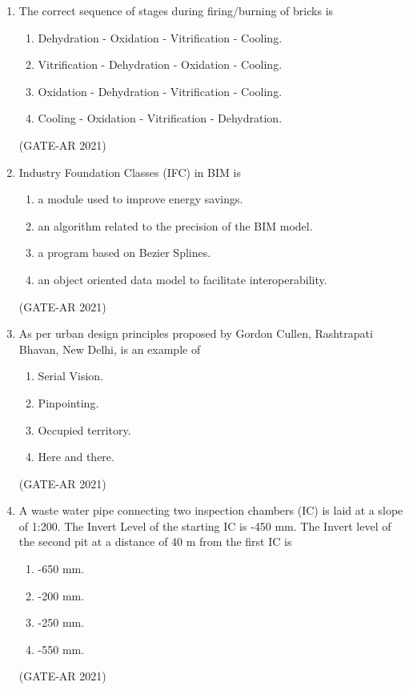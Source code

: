 \documentclass[a4paper,10pt]{article}
\begin{document}
\begin{enumerate}
    \item The correct sequence of stages during firing/burning of bricks is 
    \begin{enumerate}
        \item Dehydration - Oxidation - Vitrification - Cooling.
        \item Vitrification - Dehydration - Oxidation - Cooling.
        \item Oxidation - Dehydration - Vitrification - Cooling.
        \item Cooling - Oxidation - Vitrification - Dehydration.
    \end{enumerate}
    \hfill (GATE-AR 2021)

    \item Industry Foundation Classes (IFC) in BIM is 
    \begin{enumerate}
        \item a module used to improve energy savings.
        \item an algorithm related to the precision of the BIM model.
        \item a program based on Bezier Splines.
        \item an object oriented data model to facilitate interoperability.
    \end{enumerate}
    \hfill (GATE-AR 2021)

    \item As per urban design principles proposed by Gordon Cullen, Rashtrapati Bhavan, New Delhi, is an example of 
    \begin{multicols}{2}
    \begin{enumerate}
        \item Serial Vision.
        \item Pinpointing.
        \item Occupied territory.
        \item Here and there.
    \end{enumerate}
    \end{multicols}
    \hfill (GATE-AR 2021)

    \item A waste water pipe connecting two inspection chambers (IC) is laid at a slope of 1:200. The Invert Level of the starting IC is -450 mm. The Invert level of the second pit at a distance of 40 m from the first IC is 
    \begin{multicols}{4}
    \begin{enumerate}
        \item -650 mm.
        \item -200 mm.
        \item -250 mm.
        \item -550 mm.
    \end{enumerate}
    \end{multicols}
    \hfill (GATE-AR 2021)


\end{enumerate}
\end{document}
